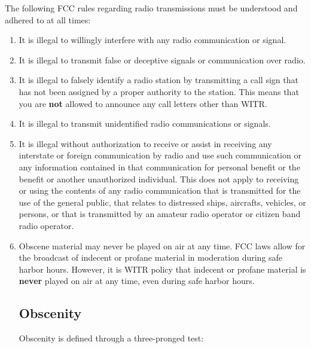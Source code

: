 \documentclass{witrman}
\begin{document}
The following FCC rules regarding radio transmissions must be understood and
adhered to at all times:
\begin{enumerate}
    \item It is illegal to willingly interfere with any radio communication or
        signal.
    \item It is illegal to transmit false or deceptive signals or communication
        over radio.
    \item It is illegal to falsely identify a radio station by transmitting a
        call sign that has not been assigned by a proper authority to the
        station. This means that you are \textbf{not} allowed to announce any
        call letters other than WITR.
    \item It is illegal to transmit unidentified radio communications or
        signals.
    \item It is illegal without authorization to receive or assist in receiving
        any interstate or foreign communication by radio and use such
        communication or any information contained in that communication for
        personal benefit or the benefit or another unauthorized individual. This
        does not apply to receiving or using the contents of any radio
        communication that is transmitted for the use of the general public,
        that relates to distressed ships, aircrafts, vehicles, or persons, or
        that is transmitted by an amateur radio operator or citizen band radio
        operator.
    \item Obscene material may never be played on air at any time. FCC laws
        allow for the broadcast of indecent or profane material in moderation
        during safe harbor hours. However, it is WITR policy that indecent or
        profane material is \textbf{never} played on air at any time, even
        during safe harbor hours.

        \subsection{Obscenity}
        \vspace{-4mm}
        Obscenity is defined through a three-pronged test:


\end{enumerate}
\end{document}
